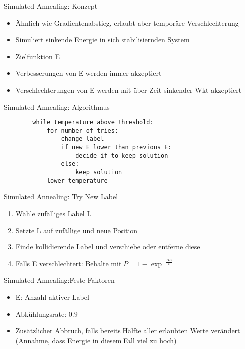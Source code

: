 \documentclass[ngerman,aspectratio=169,10pt]{beamer}
\begin{document}
\begin{frame}{Simulated Annealing: Konzept}
    \begin{itemize} 
    \item Ähnlich wie Gradientenabstieg, erlaubt aber temporäre Verschlechterung
    \item Simuliert sinkende Energie in sich stabilisiernden System
    \item Zielfunktion E
    \item Verbesserungen von E werden immer akzeptiert
    \item Verschlechterungen von E werden mit über Zeit sinkender Wkt akzeptiert
    \end{itemize} 
\end{frame}

\begin{frame}[fragile]{Simulated Annealing: Algorithmus}
    \begin{lstlisting}
        while temperature above threshold:
            for number_of_tries:
                change label
                if new E lower than previous E:
                    decide if to keep solution
                else:
                    keep solution
            lower temperature
        \end{lstlisting}
\end{frame}

\begin{frame}[fragile]{Simulated Annealing: Try New Label}
    \begin{enumerate} 
    \item Wähle zufälliges Label L
    \item Setzte L auf zufällige und neue Position
    \item Finde kollidierende Label und verschiebe oder entferne diese
    \item Falls E verschlechtert: Behalte mit $P=1-\exp^{-\frac{\Delta E}{t}}$
    \end{enumerate} 
\end{frame}

\begin{frame}[fragile]{Simulated Annealing:Feste Faktoren}
    \begin{itemize} 
    \item E: Anzahl aktiver Label
    \item Abkühlungsrate: $0.9$
    \item Zusätzlicher Abbruch, falls bereits Hälfte aller erlaubten Werte verändert\\
    (Annahme, dass Energie in diesem Fall viel zu hoch)
    \end{itemize} 
\end{frame}
\end{document}
